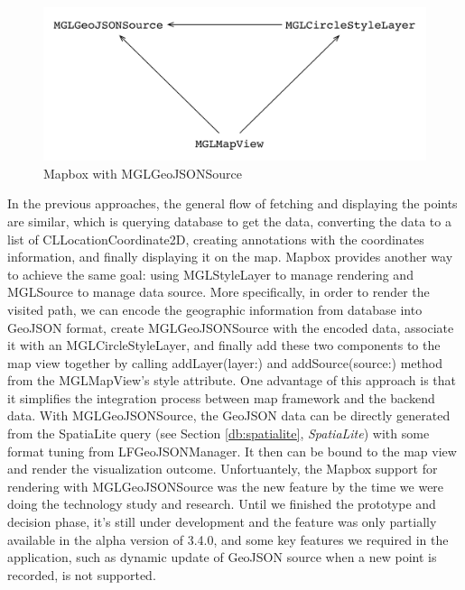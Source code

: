 \documentclass[12pt,a4paper]{article}
\renewcommand\texttt[1]{{\ttfamily\color{textttColor}#1}}
\begin{document}
                \begin{figure}
                    \includegraphics[width=.88\textwidth]{4-1-2-2-b}
                    \centering
                    \caption{Mapbox with \texttt{MGLGeoJSONSource}}
                    \label{fig:mapbox-datasource}
                \end{figure}
                
                In the previous approaches, the general flow of fetching and displaying the points are similar, which is querying database to get the data, converting the data to a list of \texttt{CLLocationCoordinate2D}, creating annotations with the coordinates information, and finally displaying it on the map. Mapbox provides another way to achieve the same goal: using \texttt{MGLStyleLayer} to manage rendering and \texttt{MGLSource} to manage data source. More specifically, in order to render the visited path, we can encode the geographic information from database into GeoJSON format, create \texttt{MGLGeoJSONSource} with the encoded data, associate it with an \texttt{MGLCircleStyleLayer}, and finally add these two components to the map view together by calling \texttt{addLayer(layer:)} and \texttt{addSource(source:)} method from the \texttt{MGLMapView}'s \texttt{style} attribute. One advantage of this approach is that it simplifies the integration process between map framework and the backend data. With \texttt{MGLGeoJSONSource}, the GeoJSON data can be directly generated from the SpatiaLite query (see Section \ref{db:spatialite}, \textit{SpatiaLite}) with some format tuning from \texttt{LFGeoJSONManager}. It then can be bound to the map view and render the visualization outcome. Unfortuantely, the Mapbox support for rendering with \texttt{MGLGeoJSONSource} was the new feature by the time we were doing the technology study and research. Until we finished the prototype and decision phase, it's still under development and the feature was only partially available in the alpha version of 3.4.0, and some key features we required in the application, such as dynamic update of GeoJSON source when a new point is recorded, is not supported.
                
\end{document}
